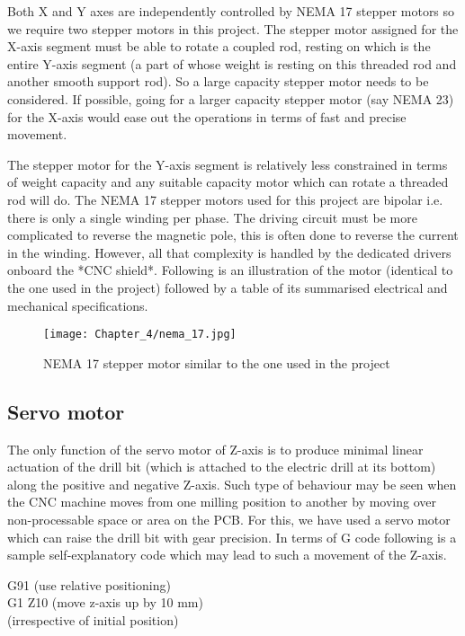 Both X and Y axes are independently controlled by NEMA 17 stepper motors so we require two stepper motors in this project. The stepper motor assigned for the X-axis segment must be able to rotate a coupled rod, resting on which is the entire Y-axis segment (a part of whose weight is resting on this threaded rod and another smooth support rod). So a large capacity stepper motor needs to be considered. If possible, going for a larger capacity stepper motor (say NEMA 23) for the X-axis would ease out the operations in terms of fast and precise movement. \par

The stepper motor for the Y-axis segment is relatively less constrained in terms of weight capacity and any suitable capacity motor which can rotate a threaded rod will do. The NEMA 17 stepper motors used for this project are bipolar i.e. there is only a single winding per phase. The driving circuit must be more complicated to reverse the magnetic pole, this is often done to reverse the current in the winding. However, all that complexity is handled by the dedicated drivers onboard the *CNC shield*. Following is an illustration of the motor (identical to the one used in the project) followed by a table of its summarised electrical and mechanical specifications.

\begin{figure}[h]
 \centering
 \texttt{[image: Chapter\_4/nema\_17.jpg]}
 \caption{NEMA 17 stepper motor similar to the one used in the project}
 \label{fig:stepper}
\end{figure}



\subsection{Servo motor}

The only function of the servo motor of Z-axis is to produce minimal linear actuation of the drill bit (which is attached to the electric drill at its bottom) along the positive and negative Z-axis. Such type of behaviour may be seen when the CNC machine moves from one milling position to another by moving over non-processable space or area on the PCB. For this, we have used a servo motor which can raise the drill bit with gear precision. In terms of G code following is a sample self-explanatory code which may lead to such a movement of the Z-axis.


\begin{flushleft}
 {\selectfont G91 (use relative positioning) \\
  G1 Z10 (move z-axis up by 10 mm) \\
  \hspace{18.2mm}(irrespective of initial position)
 }
\end{flushleft}

